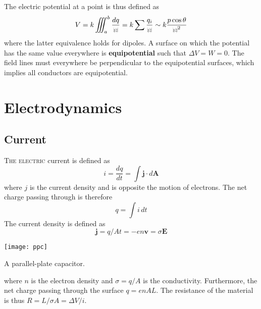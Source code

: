 \documentclass{tufte-book}
\renewcommand{\b}{\mathbf}
\def\r{{\mbox{$\resizebox{.09in}{.08in}{\texttt{[image: ScriptR]}}$}}}
\begin{document}
The electric potential at a point is thus defined as \begin{equation}
  V = k \iiint^b_a \frac{dq}{\r} = k \sum \frac{q_i}{\r} \sim k \frac{p \cos \theta}{\r^2}
\end{equation}
where the latter equivalence holds for dipoles. A surface on which the potential has the same value everywhere is \textbf{equipotential} such that $\Delta V = W = 0$. The field lines must everywhere be perpendicular to the equipotential surfaces, which implies all conductors are equipotential.

\chapter{Electrodynamics}

\section{Current}

\textsc{The electric} current is defined as \begin{equation}
  i = \frac{dq}{dt} = \int \b j \cdot d \b A
\end{equation} where $j$ is the current density and is opposite the motion of electrons. The net charge passing through is therefore \begin{equation}
  q = \int i \, dt
\end{equation}
The current density is defined as \begin{equation}
  \b j = q/At = - en \b v = \sigma \b E
\end{equation}
\begin{marginfigure}
  \texttt{[image: ppc]}
  \caption{A parallel-plate capacitor.}
\end{marginfigure}
where $n$ is the electron density and $\sigma = q/A$ is the conductivity. Furthermore, the net charge passing through the surface $q = enAL$. The resistance of the material is thus $R = L/\sigma A = \Delta V / i$.
\end{document}
